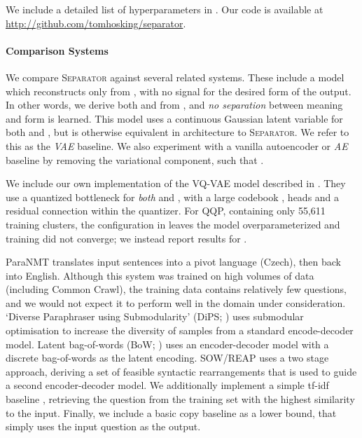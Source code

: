 \documentclass[11pt,a4paper]{article}
\begin{document}
We include a detailed list of hyperparameters in . Our code is available at \url{http://github.com/tomhosking/separator}.



\paragraph{Comparison Systems}

We compare \textsc{Separator} against several related systems.  These
include a model which reconstructs  only from
, with no signal for the desired form of the
output. In other words, we derive both  and
 from , and \textit{no separation}
between meaning and form is learned. This model uses a continuous
Gaussian latent variable for both  and
, but is otherwise equivalent in architecture to
\textsc{Separator}. We refer to this as the \textit{VAE} baseline. We
also experiment with a vanilla autoencoder or \textit{AE} baseline by
removing the variational component, such that .

We include our own implementation of the \mbox{VQ-VAE} model described
in \citet{roy-grangier-2019-unsupervised}. They use a quantized
bottleneck for \textit{both}  and
, with a large codebook ,  heads and a residual
connection within the quantizer. For QQP, containing only 55,611
training clusters, the configuration in
\citet{roy-grangier-2019-unsupervised} leaves the model
overparameterized and training did not converge; we instead report
results for .

ParaNMT \cite{wieting-gimpel-2018-paranmt} translates input sentences
into a pivot language (Czech), then back into English. Although this
system was trained on high volumes of data (including Common Crawl),
the training data contains relatively few questions, and we would not
expect it to perform well in the domain under consideration. `Diverse
Paraphraser using Submodularity' (DiPS;
\citealt{kumar-etal-2019-submodular}) uses submodular optimisation to
increase the diversity of samples from a standard encode-decoder
model. Latent bag-of-words (BoW; \citealt{latentbow}) uses an
encoder-decoder model with a discrete bag-of-words as the latent
encoding. SOW/REAP \cite{goyal_neural_2020} uses a two stage approach, deriving a set of feasible syntactic rearrangements that is used to guide a second encoder-decoder model. We additionally implement a simple \mbox{tf-idf} baseline
\cite{tfidf}, retrieving the question from the training set with the
highest similarity to the input. Finally, we include a basic copy
baseline as a lower bound, that simply uses the input question as the output.
\end{document}
